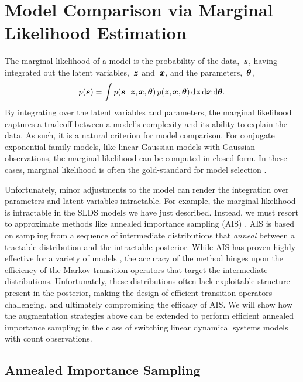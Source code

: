 \section{Model Comparison via Marginal Likelihood Estimation}
The marginal likelihood of a model is the probability of the
data,~$\boldsymbol{s}$, having integrated out the latent
variables,~$\boldsymbol{z}$ and~$\boldsymbol{x}$, and the parameters,~$\boldsymbol{\theta}$,
\begin{align*}
  p(\boldsymbol{s}) = \int p(\boldsymbol{s} \,|\, \boldsymbol{z}, \boldsymbol{x}, \boldsymbol{\theta}) \, 
  p(\boldsymbol{z}, \boldsymbol{x}, \boldsymbol{\theta}) \, \mathrm{d} \boldsymbol{z} \, \mathrm{d}\boldsymbol{x} \, \mathrm{d}\boldsymbol{\theta}.
\end{align*}
By integrating over the latent variables and parameters, the marginal
likelihood captures a tradeoff between a model's complexity and its
ability to explain the data.  As such, it is a natural criterion for
model comparison. For conjugate exponential family 
models, like linear Gaussian models with Gaussian observations,
 the marginal likelihood can be computed in closed form. 
In these cases, marginal likelihood is often the gold-standard 
for model selection \citep{kass1995bayes, grosse2015sandwiching}.

Unfortunately, minor adjustments to the model can render the
integration over parameters and latent variables intractable.  For
example, the marginal likelihood is intractable in the SLDS models we
have just described.  Instead, we must resort to approximate
methods like annealed importance sampling (AIS)
\citep{neal2001annealed}.  AIS is based on sampling from a sequence of
intermediate distributions that \emph{anneal} between a tractable
distribution and the intractable posterior. While AIS has proven
highly effective for a variety of models
\citep{grosse2015sandwiching}, the accuracy of the method hinges upon
the efficiency of the Markov transition operators that target the
intermediate distributions.  Unfortunately, these distributions often
lack exploitable structure present in the posterior, making the design
of efficient transition operators challenging, and ultimately
compromising the efficacy of AIS. We will show how the \polyagamma
augmentation strategies above can be extended to perform efficient
annealed importance sampling in the class of switching linear
dynamical systems models with count observations.

\subsection{Annealed Importance Sampling}

